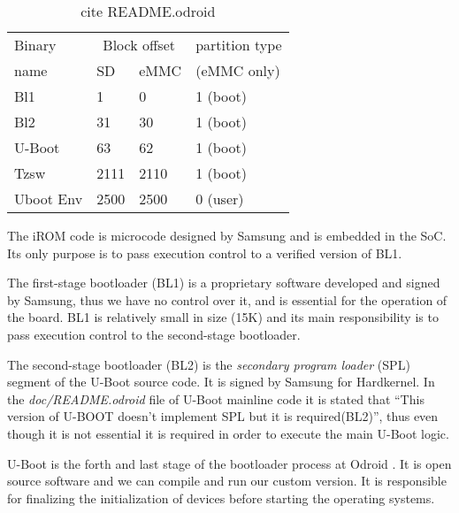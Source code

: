 \begin{table}[h]
\begin{center}
 \begin{tabular}{| l | l | l | l |}
 \hline
 Binary & \multicolumn{2}{|c|}{Block offset} & partition type \\
 name   & SD & eMMC & (eMMC only) \\
 \hline
 \hline
 Bl1 & 1 & 0 & 1 (boot) \\
 \hline
 Bl2 & 31 & 30 & 1 (boot) \\
 \hline
 U-Boot & 63 & 62 & 1 (boot) \\
 \hline
 Tzsw & 2111 & 2110 & 1 (boot) \\
 \hline
 Uboot Env & 2500 & 2500 & 0 (user) \\
 \hline
 \end{tabular}
\caption{cite README.odroid}
\label{tab:odroid-boot-placement}
\end{center}
\end{table}


The iROM code is microcode designed by Samsung and is embedded in the SoC. Its only purpose is to pass execution control to a verified version of BL1.

The first-stage bootloader (BL1) is a proprietary software developed and signed by Samsung, thus we have no control over it, and is essential for the operation of the board. BL1 is relatively small in size (15K)  and its main responsibility is to pass execution control to the second-stage bootloader.

The second-stage bootloader (BL2) is the \textit{secondary program loader} (SPL) segment of the U-Boot source code. It is signed by Samsung for Hardkernel. In the \textit{doc/README.odroid} file of U-Boot mainline code it is stated that ``This version of U-BOOT doesn't implement SPL but it is required(BL2)'', thus even though it is not essential it is required in order to execute the main U-Boot logic.

U-Boot is the forth and last stage of the bootloader process at Odroid . It is open source software and we can compile and run our custom version. It is responsible for finalizing the initialization of devices before starting the operating systems.

